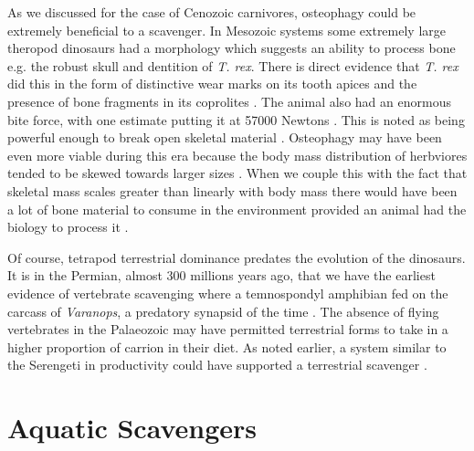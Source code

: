 \documentclass[a4paper,12pt]{article}
\begin{document}
As we discussed for the case of Cenozoic carnivores, osteophagy could be extremely beneficial to a scavenger. 
In Mesozoic systems some extremely large theropod dinosaurs had a morphology which suggests an ability to process bone e.g. the robust skull and dentition of \textit{T. rex}. There is direct evidence that \textit{T. rex} did this in the form of distinctive wear marks on its tooth apices \citep{farlow1994wear,schubert2005wear} and the presence of bone fragments in its coprolites \citep{chin1998king}. The animal also had an enormous bite force, with one estimate putting it at 57000 Newtons \citep{bates2012estimating}. This is noted as being powerful enough to break open skeletal material \citep{rayfield2001cranial}. Osteophagy may have been even more viable during this era because the body mass distribution of herbviores tended to be skewed towards larger sizes \citep{10.1371/journal.pone.0051925}. When we couple this with the fact that skeletal mass scales greater than linearly with body mass \citep{prange1979scaling} there would have been a lot of bone material to consume in the environment provided an animal had the biology to process it \citep{chure1997one}. 

Of course, tetrapod terrestrial dominance predates the evolution of the dinosaurs. It is in the Permian, almost 300 millions years ago, that we have the earliest evidence of vertebrate scavenging where a temnospondyl amphibian fed on the carcass of \textit{Varanops}, a predatory synapsid of the time \citep{reisz2006articulated}. The absence of flying vertebrates in the Palaeozoic may have permitted terrestrial forms to take in a higher proportion of carrion in their diet. As noted earlier, a system similar to the Serengeti in productivity could have supported a terrestrial scavenger \citep{ruxton2004obligate}. 

\section*{Aquatic Scavengers} 
\end{document}

